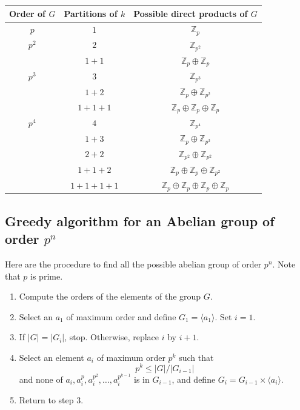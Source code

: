\begin{center}
    \begin{tabular}{c|c|c}
        Order of $G$ & Partitions of $k$ & Possible direct products of $G$\\[0.3em]
        \hline
        $p$ & $1$ & $\mathbb{Z}_p$\\[0.3em]
        \hline
        $p^2$ & $2$ & $\mathbb{Z}_{p^2}$\\[0.3em]
        & $1+1$ & $\mathbb{Z}_p \oplus \mathbb{Z}_p$\\[0.3em]
        \hline
        $p^3$ & $3$ & $\mathbb{Z}_{p^3}$\\[0.3em]
        & $1+2$ & $\mathbb{Z}_p \oplus \mathbb{Z}_{p^2}$\\[0.3em]
        & $1+1+1$ & $\mathbb{Z}_p \oplus \mathbb{Z}_p \oplus \mathbb{Z}_p$\\[0.3em]
        \hline
        $p^4$ & $4$ & $\mathbb{Z}_{p^4}$\\[0.3em]
        & $1+3$ & $\mathbb{Z}_p \oplus \mathbb{Z}_{p^3}$\\[0.3em]
        & $2+2$ & $\mathbb{Z}_{p^2} \oplus \mathbb{Z}_{p^2}$\\[0.3em]
        & $1+1+2$ & $\mathbb{Z}_p \oplus \mathbb{Z}_p \oplus \mathbb{Z}_{p^2}$\\[0.3em]
        & $1+1+1+1$ & $\mathbb{Z}_p \oplus \mathbb{Z}_p \oplus \mathbb{Z}_p \oplus \mathbb{Z}_p$\\[0.3em]
        \hline
    \end{tabular}
\end{center}

\subsection{Greedy algorithm for an Abelian group of order $p^n$}

Here are the procedure to find all the possible abelian group of order $p^n$. Note that $p$ is prime.

\begin{enumerate}
    \item Compute the orders of the elements of the group $G$.
    \item Select an $a_1$ of maximum order and define $G_1 = \langle a_1 \rangle$. Set $i = 1$.
    \item If $|G| = |G_i|$, stop. Otherwise, replace $i$ by $i + 1$.
    \item Select an element $a_i$ of maximum order $p^k$ such that 
    \[
        p^k \leq |G|/|G_{i-1}|
    \]
    and none of $a_i, a_i^{p}, a_i^{p^2}, \ldots, a_i^{p^{k-1}}$ is in $G_{i-1}$, and define $G_i = G_{i-1} \times \langle a_i \rangle$.
    \item Return to step 3.
\end{enumerate}

